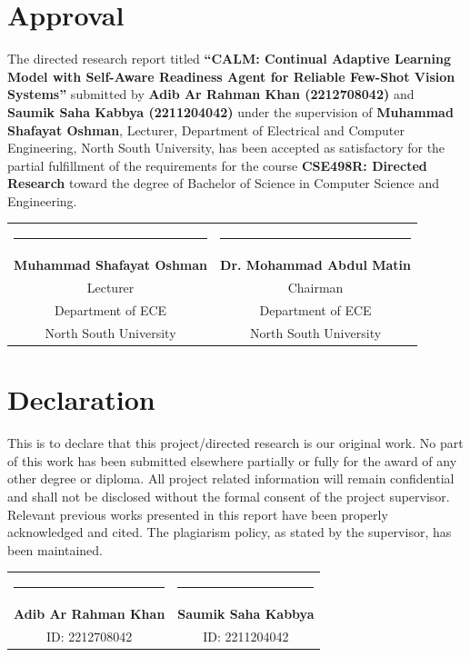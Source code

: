 \documentclass[12pt,a4paper]{report}
\begin{document}
\chapter*{Approval}

The directed research report titled \textbf{``CALM: Continual Adaptive Learning Model with Self-Aware Readiness Agent for Reliable Few-Shot Vision Systems''} submitted by \textbf{Adib Ar Rahman Khan (2212708042)} and \textbf{Saumik Saha Kabbya (2211204042)} under the supervision of \textbf{Muhammad Shafayat Oshman}, Lecturer, Department of Electrical and Computer Engineering, North South University, has been accepted as satisfactory for the partial fulfillment of the requirements for the course \textbf{CSE498R: Directed Research} toward the degree of Bachelor of Science in Computer Science and Engineering.

\vspace{3cm}
\begin{center}
\begin{tabular}{cc}
\rule{6cm}{0.4pt} & \rule{6cm}{0.4pt} \\
\textbf{Muhammad Shafayat Oshman} & \textbf{Dr. Mohammad Abdul Matin} \\
Lecturer & Chairman \\
Department of ECE & Department of ECE \\
North South University & North South University
\end{tabular}
\end{center}

\clearpage

\chapter*{Declaration}

This is to declare that this project/directed research is our original work. No part of this work has been submitted elsewhere partially or fully for the award of any other degree or diploma. All project related information will remain confidential and shall not be disclosed without the formal consent of the project supervisor. Relevant previous works presented in this report have been properly acknowledged and cited. The plagiarism policy, as stated by the supervisor, has been maintained.  

\vspace{3cm}
\begin{center}
\begin{tabular}{cc}
\rule{6cm}{0.4pt} & \rule{6cm}{0.4pt} \\
\textbf{Adib Ar Rahman Khan} & \textbf{Saumik Saha Kabbya} \\
ID: 2212708042 & ID: 2211204042
\end{tabular}
\end{center}
\end{document}
